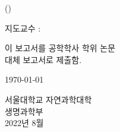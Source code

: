 
\begin{titlepage}
  \begin{center}
    \makeatletter
    \vspace*{1cm}

    \HUGE{\@title\\}
    \LARGE{(\@titlealt)}

    \vfill

    \LARGE{지도교수 : \@advisor}

    \vfill

    \huge{
      이 보고서를 공학학사 학위 논문\\
      대체 보고서로 제출함.
    }

    \vfill

    \LARGE{
      \today
    }

    \vfill

    \huge{
      서울대학교 자연과학대학\\
      생명과학부\\
      \@author
    }
    \vfill
    \huge{2022년 8월}

    \vspace*{1cm}
    \makeatother
  \end{center}
\end{titlepage}
